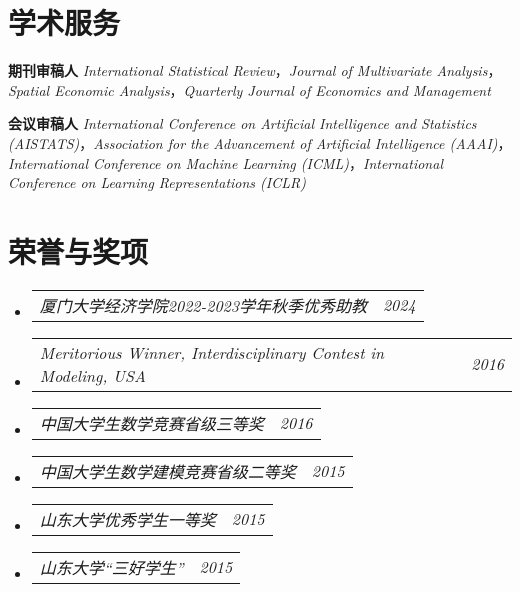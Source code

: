 \documentclass[letterpaper,10pt]{article}
\makeatletter
\newcommand{\resumeSubSubheading}[2]{
    \item
    \begin{tabular*}{0.97\textwidth}{l@{\extracolsep{\fill}}r}
      \textit{\small#1} & \textit{\small #2} \\
    \end{tabular*}\vspace{-7pt}
}
\newcommand{\resumeSubHeadingListStart}{\begin{itemize}[leftmargin=0.15in, label={}]}
\newcommand{\resumeSubHeadingListEnd}{\end{itemize}}
\makeatother
\begin{document}
  \section{学术服务}
  \begin{itemize}[leftmargin=0.15in, label={}]
    \small{
    \item \textbf{期刊审稿人} \textit{International Statistical Review}，\textit{Journal of Multivariate Analysis}，\textit{Spatial Economic Analysis}，\textit{Quarterly Journal of Economics and Management}
    \item \textbf{会议审稿人} \textit{International Conference on Artificial Intelligence and Statistics (AISTATS)}，\textit{Association for the Advancement of Artificial Intelligence (AAAI)}，\textit{International Conference on Machine Learning (ICML)}，\textit{International Conference on Learning Representations (ICLR)}
    }
  \end{itemize}



  \section{荣誉与奖项}
  \resumeSubHeadingListStart
    \resumeSubSubheading
      {厦门大学经济学院2022-2023学年秋季优秀助教}{2024}
    \resumeSubSubheading
      {Meritorious Winner, Interdisciplinary Contest in Modeling, USA}{2016}
    \resumeSubSubheading
      {中国大学生数学竞赛省级三等奖}{2016}
    \resumeSubSubheading
      {中国大学生数学建模竞赛省级二等奖}{2015}
    \resumeSubSubheading
      {山东大学优秀学生一等奖}{2015}
    \resumeSubSubheading
      {山东大学“三好学生”}{2015}
  \resumeSubHeadingListEnd
\end{document}
